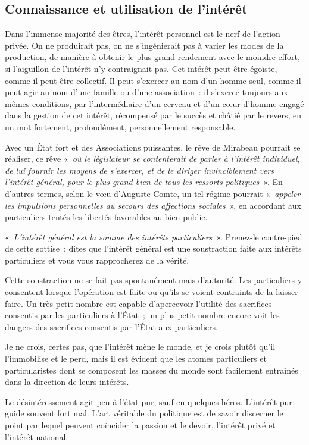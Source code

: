\documentclass[french,twoside]{book} %
\newcommand{\astermono}{\medskip\centerline{\color{rubric}\large\selectfont{\syms ✻}}\medskip\par}%
\begin{document}
\subsection[Connaissance et utilisation de l’intérêt]{Connaissance et utilisation de l’intérêt}
\noindent Dans l’immense majorité des êtres, l’intérêt personnel est le nerf de l’action privée. On ne produirait pas, on ne s’ingénierait pas à varier les modes de la production, de manière à obtenir le plus grand rendement avec le moindre effort, si l’aiguillon de l’intérêt n’y contraignait pas. Cet intérêt peut être égoïste, comme il peut être collectif. Il peut s’exercer au nom d’un homme seul, comme il peut agir au nom d’une famille ou d’une association : il s’exerce toujours aux mêmes conditions, par l’intermédiaire d’un cerveau et d’un cœur d’homme engagé dans la gestion de cet intérêt, récompensé par le succès et châtié par le revers, en un mot fortement, profondément, personnellement responsable.\par

\astermono

\noindent Avec un État fort et des Associations puissantes, le rêve de Mirabeau pourrait se réaliser, ce rêve « \emph{où le législateur se contenterait de parler à l’intérêt individuel, de lui fournir les moyens de s’exercer, et de le diriger invinciblement vers l’intérêt général, pour le plus grand bien de tous les ressorts politiques} ». En d’autres termes, selon le vœu d’Auguste Comte, un tel régime pourrait « \emph{appeler les impulsions personnelles au secours des affections sociales} », en accordant aux particuliers tentés les libertés favorables au bien public.\par

\astermono

\noindent « \emph{L’intérêt général est la somme des intérêts particuliers} ». Prenez-le contre-pied de cette sottise : dites que l’intérêt général est une soustraction faite aux intérêts particuliers et vous vous rapprocherez de la vérité.\par
Cette soustraction ne se fait pas spontanément mais d’autorité. Les particuliers y consentent lorsque l’opération est faite ou qu’ils se voient contraints de la laisser faire. Un très petit nombre est capable d’apercevoir l’utilité des sacrifices consentis par les particuliers à l’État ; un plus petit nombre encore voit les dangers des sacrifices consentis par l’État aux particuliers.\par
Je ne crois, certes pas, que l’intérêt mène le monde, et je crois plutôt qu’il l’immobilise et le perd, mais il est évident que les atomes particuliers et particularistes dont se composent les masses du monde sont facilement entraînés dans la direction de leurs intérêts.\par
Le désintéressement agit peu à l’état pur, sauf en quelques héros. L’intérêt pur guide souvent fort mal. L’art véritable du politique est de savoir discerner le point par lequel peuvent coïncider la passion et le devoir, l’intérêt privé et l’intérêt national.\par
\end{document}

